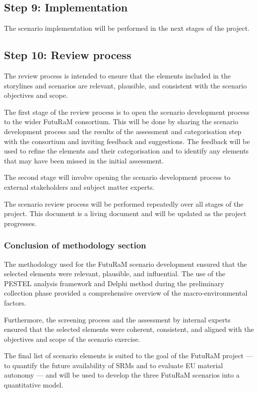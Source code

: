 \subsection{Step 9: Implementation}

The scenario implementation will be performed in the next stages of the project.

\vspace{\baselineskip} 

\subsection{Step 10: Review process}

The review process is intended to ensure that the elements included in the storylines and scenarios are relevant, plausible, and consistent with the scenario objectives and scope.

The first stage of the review process is to open the scenario development process to the wider FutuRaM consortium. This will be done by sharing the scenario development process and the results of the assessment and categorisation step with the consortium and inviting feedback and suggestions. The feedback will be used to refine the elements and their categorisation and to identify any elements that may have been missed in the initial assessment.

The second stage will involve opening the scenario development process to external stakeholders and subject matter experts.

The scenario review process will be performed repeatedly over all stages of the project. This document is a living document and will be updated as the project progresses.

\subsubsection{Conclusion of methodology section}

The methodology used for the FutuRaM scenario development ensured that the selected elements were relevant, plausible, and influential. The use of the PESTEL analysis framework and Delphi method during the preliminary collection phase provided a comprehensive overview of the macro-environmental factors.

Furthermore, the screening process and the assessment by internal experts ensured that the selected elements were coherent, consistent, and aligned with the objectives and scope of the scenario exercise.

The final list of scenario elements is suited to the goal of the FutuRaM project --- to quantify the future availability of SRMs and to evaluate EU material autonomy ---  and will be used to develop the three FutuRaM scenarios into a quantitative model.


\chapterEndlines
